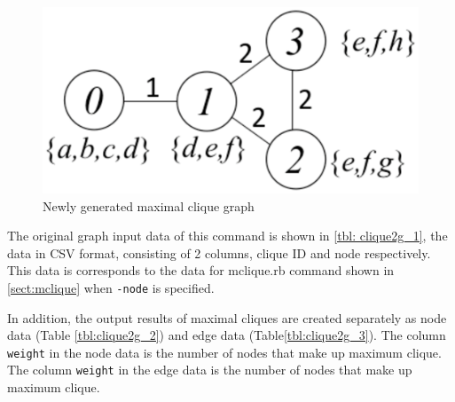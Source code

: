 \begin{figure}[htbp]
\begin{center}
\includegraphics[scale=0.5]{./clique2g_2.eps}
\caption{Newly generated maximal clique graph\label{fig:clique2g_2}}
\end{center}
\end{figure} 

The original graph input data of this command is shown in  \ref{tbl: clique2g_1}, the data in CSV format, consisting of 2 columns, clique ID and node respectively. 
This data is corresponds to the data for mclique.rb command shown in \ref{sect:mclique} when \verb|-node| is specified. 

In addition, the output results of maximal cliques are created separately as node data (Table \ref{tbl:clique2g_2}) and edge data (Table\ref{tbl:clique2g_3}). 
The column \verb|weight| in the node data is the number of nodes that make up maximum clique. 
The column \verb|weight| in the edge data is the number of nodes that make up maximum clique.   


